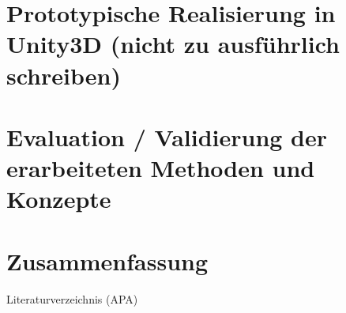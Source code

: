 \chapter{Prototypische Realisierung in Unity3D (nicht zu ausführlich schreiben)}


\chapter{Evaluation / Validierung der erarbeiteten Methoden und Konzepte}


\chapter{Zusammenfassung}


Literaturverzeichnis (APA)

